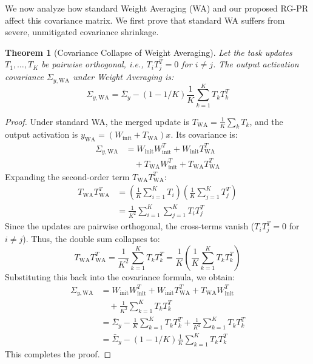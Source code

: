 \documentclass{article}
\theoremstyle{plain}
\newtheorem{theorem}{Theorem}[section]
\theoremstyle{definition}
\theoremstyle{remark}
\begin{document}
We now analyze how standard Weight Averaging (WA) and our proposed RG-PR affect this covariance matrix. We first prove that standard WA suffers from severe, unmitigated covariance shrinkage.

\begin{theorem}[Covariance Collapse of Weight Averaging]
Let the task updates $T_1, \ldots, T_K$ be pairwise orthogonal, i.e., $T_i T_j^T = 0$ for $i \neq j$. The output activation covariance $\Sigma_{y, \text{WA}}$ under Weight Averaging is:
\begin{equation}
    \Sigma_{y, \text{WA}} = \bar{\Sigma}_y - (1 - 1/K) \frac{1}{K} \sum_{k=1}^K T_k T_k^T
\end{equation}
\end{theorem}

\begin{proof}
Under standard WA, the merged update is $T_{\text{WA}} = \frac{1}{K} \sum_k T_k$, and the output activation is $y_{\text{WA}} = (W_{\text{init}} + T_{\text{WA}}) x$. Its covariance is:
\begin{equation}
    \begin{aligned}
        \Sigma_{y, \text{WA}} &= W_{\text{init}} W_{\text{init}}^T + W_{\text{init}} T_{\text{WA}}^T \\
        &\quad + T_{\text{WA}} W_{\text{init}}^T + T_{\text{WA}} T_{\text{WA}}^T
    \end{aligned}
\end{equation}
Expanding the second-order term $T_{\text{WA}} T_{\text{WA}}^T$:
\begin{equation}
    \begin{aligned}
        T_{\text{WA}} T_{\text{WA}}^T &= \left(\frac{1}{K} \sum_{i=1}^K T_i\right) \left(\frac{1}{K} \sum_{j=1}^K T_j^T\right) \\
        &= \frac{1}{K^2} \sum_{i=1}^K \sum_{j=1}^K T_i T_j^T
    \end{aligned}
\end{equation}
Since the updates are pairwise orthogonal, the cross-terms vanish ($T_i T_j^T = 0$ for $i \neq j$). Thus, the double sum collapses to:
\begin{equation}
    T_{\text{WA}} T_{\text{WA}}^T = \frac{1}{K^2} \sum_{k=1}^K T_k T_k^T = \frac{1}{K} \left( \frac{1}{K} \sum_{k=1}^K T_k T_k^T \right)
\end{equation}
Substituting this back into the covariance formula, we obtain:
\begin{align*}
    \Sigma_{y, \text{WA}} &= W_{\text{init}} W_{\text{init}}^T + W_{\text{init}} T_{\text{WA}}^T + T_{\text{WA}} W_{\text{init}}^T \\
    &\quad + \frac{1}{K^2} \sum_{k=1}^K T_k T_k^T \\
    &= \bar{\Sigma}_y - \frac{1}{K} \sum_{k=1}^K T_k T_k^T + \frac{1}{K^2} \sum_{k=1}^K T_k T_k^T \\
    &= \bar{\Sigma}_y - (1 - 1/K) \frac{1}{K} \sum_{k=1}^K T_k T_k^T
\end{align*}
This completes the proof.
\end{proof}
\end{document}
